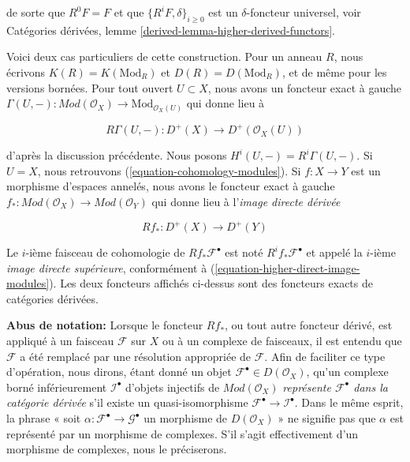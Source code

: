 de sorte que $R^0F = F$ et que $\{R^iF, \delta\}_{i \geq 0}$ est un
$\delta$-foncteur universel, voir Catégories dérivées, lemme \ref{derived-lemma-higher-derived-functors}.

\medskip\noindent

Voici deux cas particuliers de cette construction. Pour un anneau $R$, nous écrivons $K(R) = K(\text{Mod}_R)$ et
$D(R) = D(\text{Mod}_R)$, et de même pour les versions bornées. Pour tout ouvert $U \subset X$, nous avons un foncteur exact à gauche
$
\Gamma(U, -) :
\textit{Mod}(\mathcal{O}_X)
\longrightarrow
\text{Mod}_{\mathcal{O}_X(U)}
$
qui donne lieu à

\begin{equation}
\label{equation-total-derived-cohomology}
R\Gamma(U, -) :
D^{+}(X)
\longrightarrow
D^{+}(\mathcal{O}_X(U))
\end{equation}

d'après la discussion précédente. Nous posons $H^i(U, -) = R^i\Gamma(U, -)$. Si $U = X$, nous retrouvons (\ref{equation-cohomology-modules}). Si $f : X \to Y$ est un morphisme d'espaces annelés, nous avons le foncteur exact à gauche
$
f_* :
\textit{Mod}(\mathcal{O}_X)
\longrightarrow
\textit{Mod}(\mathcal{O}_Y)
$
qui donne lieu à l'{\it image directe dérivée}

\begin{equation}
\label{equation-total-derived-direct-image}
Rf_* :
D^{+}(X)
\longrightarrow
D^{+}(Y)
\end{equation}

Le $i$-ième faisceau de cohomologie de $Rf_*\mathcal{F}^\bullet$ est noté
$R^if_*\mathcal{F}^\bullet$ et appelé la $i$-ième {\it image directe supérieure},
conformément à (\ref{equation-higher-direct-image-modules}). Les deux foncteurs affichés ci-dessus sont des foncteurs exacts de catégories dérivées.

\medskip\noindent
{\bf Abus de notation:} Lorsque le foncteur $Rf_*$, ou tout autre foncteur dérivé, est appliqué à un faisceau $\mathcal{F}$ sur $X$ ou à un complexe de faisceaux, il est entendu que $\mathcal{F}$ a été remplacé par une résolution appropriée de $\mathcal{F}$. Afin de faciliter ce type d'opération, nous dirons, étant donné un objet $\mathcal{F}^\bullet \in D(\mathcal{O}_X)$, qu'un complexe borné inférieurement $\mathcal{I}^\bullet$ d'objets injectifs de $\textit{Mod}(\mathcal{O}_X)$ {\it représente $\mathcal{F}^\bullet$ dans la catégorie dérivée} s'il existe un quasi-isomorphisme $\mathcal{F}^\bullet \to \mathcal{I}^\bullet$. Dans le même esprit, la phrase « soit $\alpha : \mathcal{F}^\bullet \to \mathcal{G}^\bullet$ un morphisme de $D(\mathcal{O}_X)$ » ne signifie pas que $\alpha$ est représenté par un morphisme de complexes. S'il s'agit effectivement d'un morphisme de complexes, nous le préciserons.









